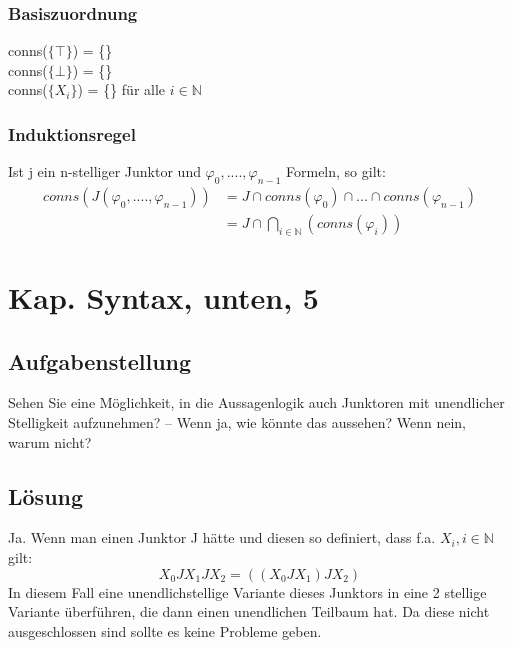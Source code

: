 \documentclass[12pt, a4paper]{article}
\begin{document}
\subsubsection*{Basiszuordnung}
conns($\{ \top \}$) = \{\}\\
conns($\{ \bot \}$) = \{\}\\
conns($\{ X_i \}$) = \{\} für alle $i \in \mathds{N}$
\subsubsection*{Induktionsregel}
Ist j ein n-stelliger Junktor und $\varphi_0,....,\varphi_{n-1}$ Formeln, so gilt:\\
\begin{equation}
\begin{split}
conns(J(\varphi_0,....,\varphi_{n-1})) &= J \cap conns(\varphi_0) \cap ... \cap conns(\varphi_{n-1})\\
&= J \cap \bigcap_{i \in \mathds{N}}(conns(\varphi_i))
\end{split}
\end{equation}

\section*{Kap. Syntax, unten, 5}
\subsection*{Aufgabenstellung}
Sehen Sie eine Möglichkeit, in die Aussagenlogik auch Junktoren mit unendlicher Stelligkeit aufzunehmen? – Wenn ja, wie könnte das aussehen? Wenn nein, warum nicht?
\subsection*{Lösung}
Ja. Wenn man einen Junktor J hätte und diesen so definiert, dass f.a. $X_i, i \in \mathds{N}$ gilt:
\begin{equation}
X_0 J X_1 J X_2 = ((X_0 J X_1) J X_2)
\end{equation}
In diesem Fall eine unendlichstellige Variante dieses Junktors in eine 2 stellige Variante überführen, die dann einen unendlichen Teilbaum hat. Da diese nicht ausgeschlossen sind sollte es keine Probleme geben.
\end{document}
